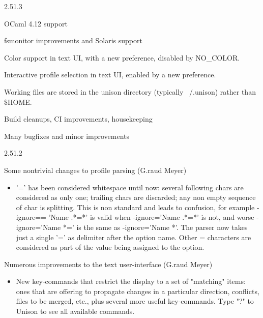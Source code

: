 \begin{changesfromversion}{2.51.3}
\item OCaml 4.12 support
\item fsmonitor improvements and Solaris support
\item Color support in text UI, with a new preference, disabled by
  NO\_COLOR.
\item Interactive profile selection in text UI, enabled by a new
  preference.
\item Working files are stored in the unison directory (typically
  ~/.unison) rather than \$HOME.
\item Build cleanups, CI improvements, housekeeping
\item Many bugfixes and minor improvements
\end{changesfromversion}

\begin{changesfromversion}{2.51.2}
\item Some nontrivial changes to profile parsing (G.raud Meyer)
  \begin{itemize}
  \item '=' has been considered whitespace until now: several
    following chars are considered as only one; trailing chars are
    discarded; any non empty sequence of char is splitting. This is non
    standard and leads to confusion, for example -ignore== 'Name .*=*'
    is valid when -ignore='Name .*=*' is not, and worse -ignore='Name
    *=' is the same as -ignore='Name *'.  The parser now takes just a
    single '=' as delimiter after the option name.  Other = characters
    are considered as part of the value being assigned to the option.
  \end{itemize}
\item Numerous improvements to the text user-interface (G.raud Meyer)
  \begin{itemize}
  \item New key-commands that restrict the display to a set of
    "matching" items: ones that are offering to propagate changes in a
    particular direction, conflicts, files to be merged, etc., plus
    several more useful key-commands.  Type "?" to Unison to see all
    available commands.
  \end{itemize}
\end{changesfromversion}

